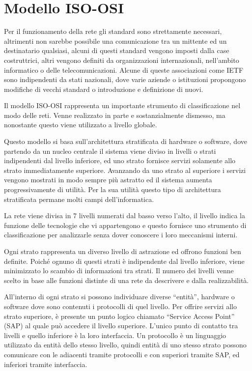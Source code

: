 \documentclass{article}
\numberwithin{equation}{subsection}
\begin{document}
\section{Modello ISO-OSI}

Per il funzionamento della rete gli standard sono strettamente necessari, altrimenti non sarebbe possibile una comunicazione tra un mittente ed un destinatario qualsiasi, 
alcuni di questi standard vengono imposti dalla case costruttrici, altri vengono definiti da organizzazioni internazionali, nell'ambito informatico o delle 
telecomunicazioni. Alcune di queste associazioni come IETF sono indipendenti da stati nazionali, dove varie aziende o istituzioni propongono modifiche di vecchi 
standard o introduzione e definizione di nuovi. 

Il modello ISO-OSI rappresenta un importante strumento di classificazione nel modo delle reti. Venne realizzato in parte e sostanzialmente dismesso, ma nonostante 
questo viene utilizzato a livello globale. 

Questo modello si basa sull'architettura stratificata di hardware o software, dove partendo da un nucleo centrale il sistema viene diviso in livelli o strati 
indipendenti dal livello inferiore, ed uno strato fornisce servizi solamente allo strato immediatamente superiore. Avanzando da uno strato al superiore i servizi vengono mostrati in modo 
sempre più astratto ed il sistema aumenta progressivamente di utilità. Per la sua utilità questo tipo di architettura stratificata permane molti campi dell'informatica. 

La rete viene divisa in 7 livelli numerati dal basso verso l'alto, il livello indica la funzione delle tecnologie che vi appartengono e questo fornisce uno strumento di 
classificazione per analizzarle senza dover conoscere i loro meccanismi interni. 


Ogni strato rappresenta un diverso livello di astrazione ed offrono funzioni ben definite. Poiché ognuno di questi strati è indipendente dal livello inferiore, viene minimizzato lo scambio 
di informazioni tra strati. Il numero dei livelli venne scelto in base alle funzioni distinte di una rete da descrivere e dalla realizzabilità. 

All'interno di ogni strato si possono individuare diverse ``entità'', hardware o software dove sono contenuti i protocolli di quel livello. Per offrire servizi allo 
strato superiore, è presente un punto logico chiamato ``Service Access Point'' (SAP) al quale può accedere il livello superiore. 
L'unico punto di contatto tra livelli e quello inferiore è la loro interfaccia. Un protocollo è un linguaggio utilizzato da entità dello stesso livello, quindi entità 
di uno stesso strato possono comunicare con le adiacenti tramite protocolli e con superiori tramite SAP, ed inferiori tramite interfaccia. 
\end{document}
